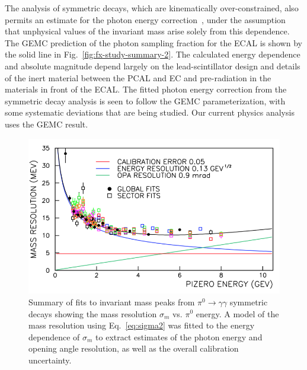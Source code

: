 The analysis of symmetric decays, which are kinematically over-constrained, also permits an estimate for the photon
energy correction~\cite{2006015}, under the assumption that unphysical values of the invariant mass arise solely
from this dependence. The GEMC prediction of the photon sampling fraction for the ECAL is shown by the solid line
in Fig.~\ref{fig:fx-study-summary-2}. The calculated energy dependence and absolute magnitude depend largely on
the lead-scintillator design and details of the inert material between the PCAL and EC and pre-radiation in the
materials in front of the ECAL. The fitted photon energy correction from the symmetric decay analysis is seen to
follow the GEMC parameterization, with some systematic deviations that are being studied. Our current physics
analysis uses the GEMC result.

\begin{figure}[h]
\centering
\includegraphics[width=1.0\columnwidth,keepaspectratio]{img/fx-study-summary.png}
\caption[]{Summary of fits to invariant mass peaks from $\pi^0 \rightarrow \gamma \gamma$ symmetric
  decays showing the mass resolution $\sigma_m$ vs. $\pi^0$ energy. A model of the mass resolution using
  Eq.~\ref{eq:sigma2} was fitted to the energy dependence of $\sigma_m$ to extract estimates of the photon
  energy and opening angle resolution, as well as the overall calibration uncertainty.}
\label{fig:fx-study-summary}
\end{figure}

